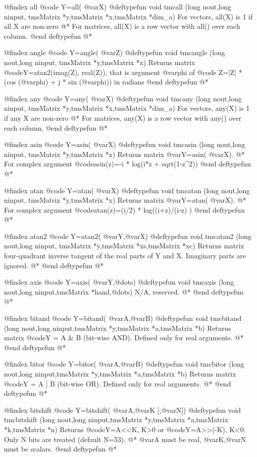 @findex  all
@code{  Y=all( @var{X})}
@deftypefun void tmcall (long nout,long ninput, tmsMatrix *y,tmsMatrix *x,tmsMatrix *dim_a)
For vectors, all(X) is 1 if all X are non-zero @*
For matrices, all(X) is a row vector with all() over each column.
@end deftypefun
@*

@findex  angle
@code{  Y=angle( @var{Z})}
@deftypefun void tmcangle (long nout,long ninput, tmsMatrix *y,tmsMatrix *x)
Returns matrix @code{Y=atan2(imag(Z), real(Z))}, that is argument @var{phi} of @code{ Z=|Z| * (cos (@var{phi}) + j * sin (@var{phi}))} in radians
@end deftypefun
@*

@findex  any
@code{  Y=any( @var{X})}
@deftypefun void tmcany (long nout,long ninput, tmsMatrix *y,tmsMatrix *x,tmsMatrix *dim_a)
For vectors, any(X) is 1 if any X are non-zero @*
For matrices, any(X) is a row vector with any() over each column.
@end deftypefun
@*

@findex  asin
@code{  Y=asin( @var{X})}
@deftypefun void tmcasin (long nout,long ninput, tmsMatrix *y,tmsMatrix *x)
Returns matrix @var{Y}=asin( @var{X}). @*
For complex argument @code{asin(z)=-i *  log(i*z +   sqrt(1-z^2))}
@end deftypefun
@*

@findex  atan
@code{  Y=atan( @var{X})}
@deftypefun void tmcatan (long nout,long ninput, tmsMatrix *y,tmsMatrix *x)
Returns matrix @var{Y}=atan( @var{X}). @*
For complex argument @code{atan(z)=(i/2) *  log((i+z)/(i-z) )}
@end deftypefun
@*

@findex  atan2
@code{  Y=atan2( @var{Y},@var{X})}
@deftypefun void tmcatan2 (long nout,long ninput, tmsMatrix *y,tmsMatrix *xs,tmsMatrix *xc)
Returns matrix four-quadrant inverse tangent  of the real parts of Y and X. Imaginary parts are ignored. @*
@end deftypefun
@*

@findex  axis
@code{  Y=axis( @var{Y},@dots{})}
@deftypefun void tmcaxis (long nout,long ninput,tmsMatrix *hand,@dots{})
N/A, reserved. @*
@end deftypefun
@*

@findex  bitand
@code{  Y=bitand( @var{A},@var{B})}
@deftypefun void tmcbitand (long nout,long ninput,tmsMatrix *y,tmsMatrix *a,tmsMatrix *b)
Returns matrix @code{Y = A & B}  (bit-wise AND). Defined only for real arguments. @*
@end deftypefun
@*

@findex  bitor
@code{ Y=bitor( @var{A},@var{B})}
@deftypefun void tmcbitor (long nout,long ninput,tmsMatrix *y,tmsMatrix *a,tmsMatrix *b)
Returns matrix @code{Y = A | B}  (bit-wise OR). Defined only for real arguments. @*
@end deftypefun
@*

@findex  bitshift
@code{  Y=bitshift( @var{A},@var{K } [,@var{N}])}
@deftypefun void tmcbitshift (long nout,long ninput,tmsMatrix *y,tmsMatrix *a,tmsMatrix *k,tmsMatrix *n)
Returns @code{Y=A<<K, K>0 } or @code{Y=A>>(-K), K<0}. Only N bits are treated (default N=53). @*
@var{A} must be real, @var{K},@var{N} must be scalars.
@end deftypefun
@*

